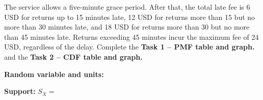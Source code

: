 The service allows a five-minute grace period. After that, the total late fee
is 6 USD for returns up to 15 minutes late, 12 USD for returns more than 15
but no more than 30 minutes late, and 18 USD for returns more than 30 but no
more than 45 minutes late. Returns exceeding 45 minutes incur the maximum fee
of 24 USD, regardless of the delay.  Complete the \textbf{Task 1 -- PMF table and graph.} and the \textbf{Task 2 -- CDF table and graph.}


\textbf{Random variable and units:} \hrulefill 

\textbf{Support:} $S_X=$ \hrulefill
\par

